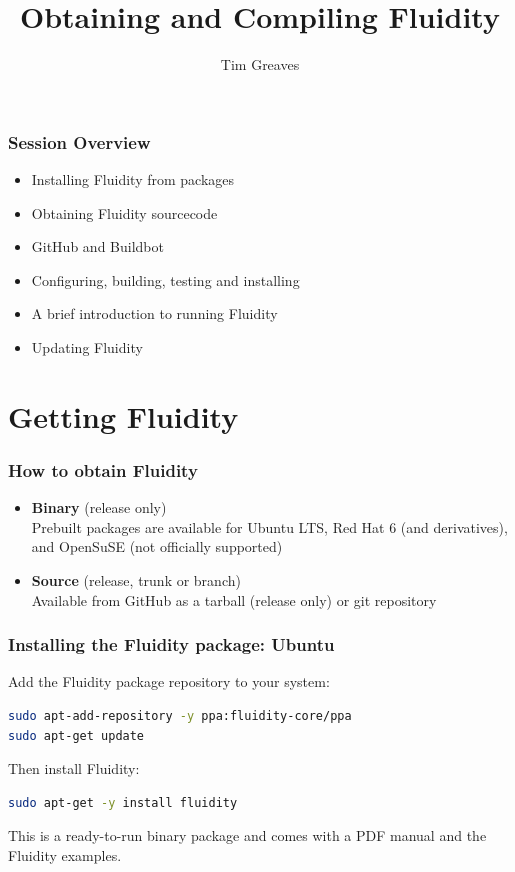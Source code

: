 \documentclass[12pt]{beamer}
\title[Fluidity]{Obtaining and Compiling Fluidity}
\subtitle[]{}
\institute{1 - Dept of Earth Science and Engineering, Imperial College London}
\author[Tim Greaves]{\large{Tim Greaves}\inst{1}}
\date{}
\begin{document}
\begin{frame}
  \titlepage
\end{frame}

\begin{frame}
  \frametitle{Session Overview}
\begin{itemize}
    \item Installing Fluidity from packages
    \item Obtaining Fluidity sourcecode
    \item GitHub and Buildbot
    \item Configuring, building, testing and installing
    \item A brief introduction to running Fluidity
    \item Updating Fluidity
\end{itemize}
\end{frame}


\section{Getting Fluidity}
\begin{frame}
        \frametitle{How to obtain Fluidity}
\begin{itemize}
    \item {\bf Binary} (release only)
	  \\Prebuilt packages are available for Ubuntu LTS, Red Hat 6 (and
              derivatives), and OpenSuSE (not officially supported)
    \item {\bf Source} (release, trunk or branch)
	  \\Available from GitHub as a tarball (release only) or git repository
\end{itemize}
\end{frame}

\begin{frame}[fragile]
        \frametitle{Installing the Fluidity package: Ubuntu}
\lstset{language=bash}
Add the Fluidity package repository to your system:
\begin{lstlisting}[language=bash,basicstyle=\ttfamily\scriptsize]
sudo apt-add-repository -y ppa:fluidity-core/ppa
sudo apt-get update
\end{lstlisting}
Then install Fluidity:
\begin{lstlisting}[language=bash,basicstyle=\ttfamily\scriptsize]
sudo apt-get -y install fluidity
\end{lstlisting}
This is a ready-to-run binary package and comes with a PDF manual and the
Fluidity examples.
\end{frame}
\end{document}
